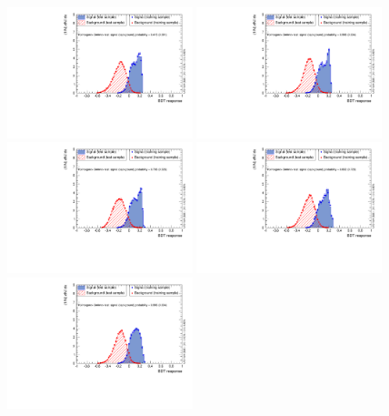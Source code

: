 \begin{figure}
        \centering
                \includegraphics[width=0.48\textwidth]{Figures/bdt/overtrain_BDT_barrel_0}
                \includegraphics[width=0.48\textwidth]{Figures/bdt/overtrain_BDT_endcaps_0}
                \includegraphics[width=0.48\textwidth]{Figures/bdt/overtrain_BDT_barrel_1}
                \includegraphics[width=0.48\textwidth]{Figures/bdt/overtrain_BDT_endcaps_1}
                \includegraphics[width=0.48\textwidth]{Figures/bdt/overtrain_BDT_barrel_2}

\end{figure}
